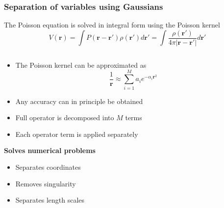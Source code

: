 \begin{frame}
    \frametitle{Separation of variables using Gaussians}
    \centering
    The Poisson equation is solved in integral form using the Poisson kernel
    \begin{equation}
	\nonumber
	V(\boldsymbol{r}) = \int P(\boldsymbol{r}-\boldsymbol{r'})
        \rho(\boldsymbol{r'}) d\boldsymbol{r'} =
	\int\frac{\rho(\boldsymbol{r'})}
        {4\pi|\boldsymbol{r} - \boldsymbol{r'}|} d\boldsymbol{r'} 
    \end{equation}

    \vspace{3mm}

    \begin{columns}
    \begin{column}{.50\textwidth}
    \begin{itemize}
	\item The Poisson kernel can be approximated as
	    \begin{equation}
		\nonumber
		\frac{1}{\boldsymbol{r}} \approx 
                \sum_{i=1}^M a_i e^{-\alpha_i \boldsymbol{r}^2} 
	    \end{equation}
	\item Any accuracy can in principle be obtained
	\item Full operator is decomposed into $M$ terms
	\item Each operator term is applied separately
    \end{itemize}

    \vspace{6mm}

    \hspace{3mm} \textbf{Solves numerical problems}

    \begin{itemize}
	\item	Separates coordinates
	\item	Removes singularity
	\item	Separates length scales
    \end{itemize}


\end{column}
\end{columns}
\end{frame}
